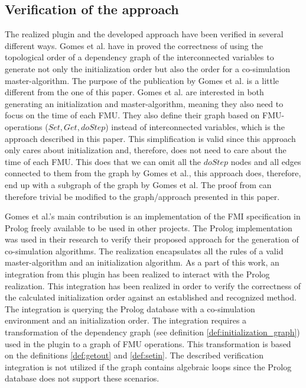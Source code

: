 \documentclass[runningheads]{llncs}
\begin{document}
\subsection{Verification of the approach}
The realized plugin and the developed approach have been verified in several different ways. Gomes et al. have in \cite{gomes_lucio_vangheluwe_2019} proved the correctness of using the topological order of a dependency graph of the interconnected variables to generate not only the initialization order but also the order for a co-simulation master-algorithm. The purpose of the publication by Gomes et al. is a little different from the one of this paper. Gomes et al. are interested in both generating an initialization and master-algorithm, meaning they also need to focus on the time of each FMU. They also define their graph based on FMU-operations ($Set, Get, doStep$) instead of interconnected variables, which is the approach described in this paper. This simplification is valid since this approach only cares about initialization and, therefore, does not need to care about the time of each FMU. This does that we can omit all the $doStep$ nodes and all edges connected to them from the graph by Gomes et al., this approach does, therefore, end up with a subgraph of the graph by Gomes et al. The proof from \cite{gomes_lucio_vangheluwe_2019} can therefore trivial be modified to the graph/approach presented in this paper.

Gomes et al.'s main contribution is an implementation of the FMI specification in Prolog freely available to be used in other projects. The Prolog implementation was used in their research to verify their proposed approach for the generation of co-simulation algorithms. The realization encapsulates all the rules of a valid master-algorithm and an initialization algorithm. As a part of this work, an integration from this plugin has been realized to interact with the Prolog realization. This integration has been realized in order to verify the correctness of the calculated initialization order against an established and recognized method. The integration is querying the Prolog database with a co-simulation environment and an initialization order. The integration requires a transformation of the dependency graph (see definition \ref{def:initialization_graph}) used in the plugin to a graph of FMU operations. This transformation is based on the definitions \ref{def:getout} and \ref{def:setin}. The described verification integration is not utilized if the graph contains algebraic loops since the Prolog database does not support these scenarios.
\end{document}
